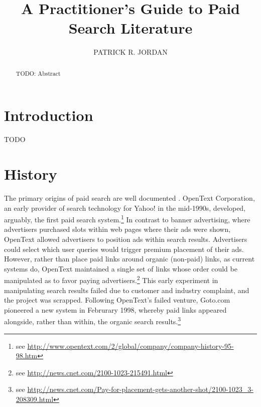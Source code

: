 \documentclass[prodmode,acmtist]{acmsmall} %
\begin{document}

\title{A Practitioner's Guide to Paid Search Literature}
\author{PATRICK R. JORDAN
}

\begin{abstract}
TODO: Abstract
\end{abstract}





\maketitle

\section{Introduction}

TODO

\section{History} %
\label{sec:history}

The primary origins of paid search are well documented \cite{Jansen:2008uq}.
OpenText Corporation, an early provider of search technology for Yahoo! in the mid-1990s, developed, arguably, the first paid search system.\footnote{see \url{http://www.opentext.com/2/global/company/company-history-95-98.htm}}
In contrast to banner advertising, where advertisers purchased slots within web pages where their ads were shown, OpenText allowed advertisers to position ads within search results.
Advertisers could select which user queries would trigger premium placement of their ads.
However, rather than place paid links around organic (non-paid) links, as current systems do, OpenText maintained a single set of links whose order could be manipulated as to favor paying advertisers.\footnote{see \url{http://news.cnet.com/2100-1023-215491.html}}
This early experiment in manipulating search results failed due to customer and industry complaint, and the project was scrapped. 
Following OpenText's failed venture, Goto.com pioneered a new system in Februrary 1998, whereby paid links appeared alongside, rather than within, the organic search results.\footnote{see \url{http://news.cnet.com/Pay-for-placement-gets-another-shot/2100-1023_3-208309.html}}
\end{document}
